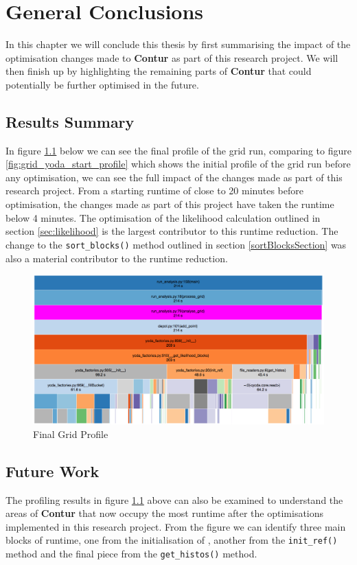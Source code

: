 \chapter{General Conclusions}
\label{chapterlabel6}
In this chapter we will conclude this thesis by first summarising the impact of the optimisation changes made to \textbf{Contur} as part of this research project. We will then finish up by highlighting the remaining parts of \textbf{Contur} that could potentially be further optimised in the future.

\section{Results Summary}

In figure \ref{fig:final_grid_profile} below we can see the final profile of the grid run, comparing to figure \ref{fig:grid_yoda_start_profile} which shows the initial profile of the grid run before any optimisation, we can see the full impact of the changes made as part of this research project. From a starting runtime of close to 20 minutes before optimisation, the changes made as part of this project have taken the runtime below 4 minutes. The optimisation of the likelihood calculation outlined in section \ref{sec:likelihood} is the largest contributor to this runtime reduction. The change to the \texttt{sort\_blocks()} method outlined in section \ref{sortBlocksSection} was also a material contributor to the runtime reduction.

\begin{figure}[H]
\centering
\includegraphics[scale=0.3]{plots/final_grid_profile.png}
\caption{Final Grid Profile}
\label{fig:final_grid_profile}
\end{figure}

\section{Future Work}
The profiling results in figure \ref{fig:final_grid_profile} above can also be examined to understand the areas of \textbf{Contur} that now occupy the most runtime after the optimisations implemented in this research project. From the figure we can identify three main blocks of runtime, one from the initialisation of , another from the \texttt{init\_ref()} method and the final piece from the \texttt{get\_histos()} method.

